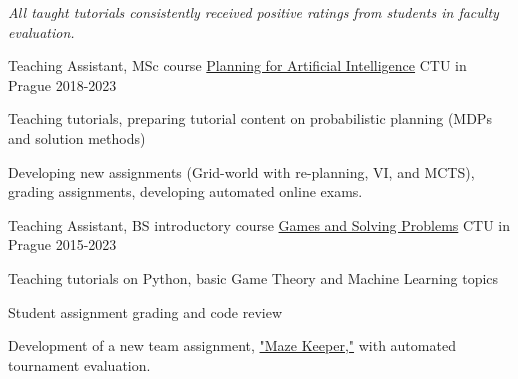 
\vspace{-0.3cm}
\begin{small}\textit{All taught tutorials consistently received positive ratings from students in faculty evaluation.}\end{small}


\begin{cventries}


  \cventry
    {Teaching Assistant, MSc course} %
    {\href{https://cw.fel.cvut.cz/b222/courses/pui/tutorials}{Planning for Artificial Intelligence}} %
    {CTU in Prague} %
    {2018-2023} %
    {
      \begin{cvitems} %
        \item {Teaching tutorials, preparing tutorial content on probabilistic planning (MDPs and solution methods)}
        \item {Developing new assignments (Grid-world with re-planning, VI, and MCTS), grading assignments, developing automated online exams.}
      \end{cvitems}
    }

  \cventry
    {Teaching Assistant, BS introductory course} %
    {\href{https://cw.fel.cvut.cz/b221/courses/b4b33rph/start}{Games and Solving Problems}} %
    {CTU in Prague} %
    {2015-2023} %
    {
      \begin{cvitems} %
        \item {Teaching tutorials on Python, basic Game Theory and Machine Learning topics}
        \item {Student assignment grading and code review}
        \item {Development of a new team assignment, \href{https://cw.fel.cvut.cz/b181/courses/b4b33rph/cviceni/maze_keeper}{"Maze Keeper,"} with automated tournament evaluation.}
      \end{cvitems}
    }


\end{cventries}
